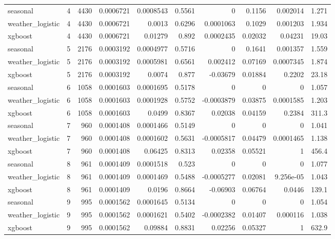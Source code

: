 \begin{table}
\begin{tabular}{llrrrrrrrr}
seasonal & 4 & 4430 & 0.0006721 & 0.0008543 & 0.5561 & 0 & 0.1156 & 0.002014 & 1.271 \\
weather_logistic & 4 & 4430 & 0.0006721 & 0.0013 & 0.6296 & 0.0001063 & 0.1029 & 0.001203 & 1.934 \\
xgboost & 4 & 4430 & 0.0006721 & 0.01279 & 0.892 & 0.0002435 & 0.02032 & 0.04231 & 19.03 \\
seasonal & 5 & 2176 & 0.0003192 & 0.0004977 & 0.5716 & 0 & 0.1641 & 0.001357 & 1.559 \\
weather_logistic & 5 & 2176 & 0.0003192 & 0.0005981 & 0.6561 & 0.002412 & 0.07169 & 0.0007345 & 1.874 \\
xgboost & 5 & 2176 & 0.0003192 & 0.0074 & 0.877 & -0.03679 & 0.01884 & 0.2202 & 23.18 \\
seasonal & 6 & 1058 & 0.0001603 & 0.0001695 & 0.5178 & 0 & 0 & 0 & 1.057 \\
weather_logistic & 6 & 1058 & 0.0001603 & 0.0001928 & 0.5752 & -0.0003879 & 0.03875 & 0.0001585 & 1.203 \\
xgboost & 6 & 1058 & 0.0001603 & 0.0499 & 0.8367 & 0.02038 & 0.04159 & 0.2384 & 311.3 \\
seasonal & 7 & 960 & 0.0001408 & 0.0001466 & 0.5149 & 0 & 0 & 0 & 1.041 \\
weather_logistic & 7 & 960 & 0.0001408 & 0.0001602 & 0.5631 & -0.0005817 & 0.04479 & 0.0001465 & 1.138 \\
xgboost & 7 & 960 & 0.0001408 & 0.06425 & 0.8313 & 0.02358 & 0.05521 & 1 & 456.4 \\
seasonal & 8 & 961 & 0.0001409 & 0.0001518 & 0.523 & 0 & 0 & 0 & 1.077 \\
weather_logistic & 8 & 961 & 0.0001409 & 0.0001469 & 0.5488 & -0.0005277 & 0.02081 & 9.256e-05 & 1.043 \\
xgboost & 8 & 961 & 0.0001409 & 0.0196 & 0.8664 & -0.06903 & 0.06764 & 0.0446 & 139.1 \\
seasonal & 9 & 995 & 0.0001562 & 0.0001645 & 0.5134 & 0 & 0 & 0 & 1.054 \\
weather_logistic & 9 & 995 & 0.0001562 & 0.0001621 & 0.5402 & -0.0002382 & 0.01407 & 0.000116 & 1.038 \\
xgboost & 9 & 995 & 0.0001562 & 0.09884 & 0.8831 & 0.02256 & 0.05327 & 1 & 632.9 \\
\bottomrule
\end{tabular}
\end{table}
